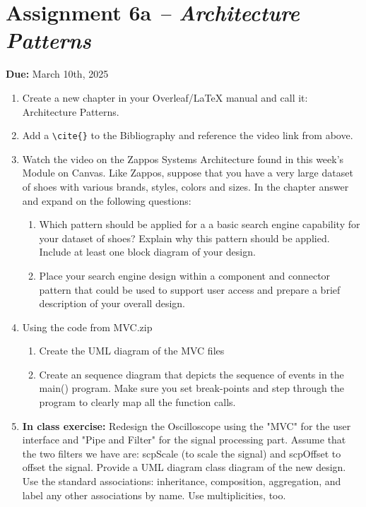 \section{Assignment 6a \textit{-- Architecture Patterns}}\label{Assignments::6a}
\textbf{Due:} March 10th, 2025 \\
\begin{enumerate}
    \item Create a new chapter in your Overleaf/LaTeX manual and call it: Architecture Patterns.
    \item Add a \verb|\cite{}| to the Bibliography and reference the video link from above.
    \item Watch the video on the Zappos Systems Architecture found in this week's Module on Canvas.  Like Zappos, suppose that you have a very large dataset of shoes with various brands, styles, colors and sizes. In the chapter answer and expand on the following questions:
    \begin{enumerate}
        \item Which pattern should be applied for a a basic search engine capability for your dataset of shoes? Explain why this pattern should be applied.  Include at least one block diagram of your design.
        \item Place your search engine design within a component and connector pattern that could be used to support user access and prepare a brief description of your overall design.
    \end{enumerate}
    \item Using the code from MVC.zip
    \begin{enumerate}
        \item Create the UML diagram of the MVC files
        \item Create an sequence diagram that depicts the sequence of events in the main() program.  Make sure you set break-points and step through the program to clearly map all the function calls.
    \end{enumerate}
    \item \textbf{In class exercise:} Redesign the Oscilloscope using the "MVC" for the user interface and "Pipe and Filter" for the signal processing part.  Assume that the two filters we have are: scpScale (to scale the signal) and scpOffset to offset the signal.  Provide a UML diagram class diagram of the new design.  Use the standard associations: inheritance, composition, aggregation, and label any other associations by name.  Use multiplicities, too.
\end{enumerate}
